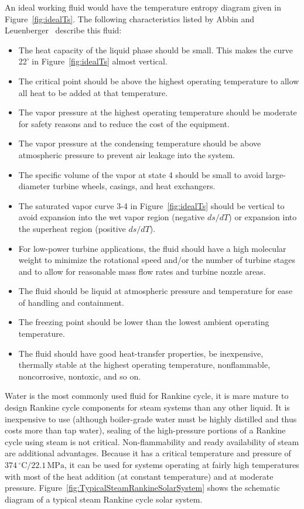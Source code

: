 An ideal working fluid would have the temperature entropy diagram given in Figure~\ref{fig:idealTs}. The following characteristics listed by Abbin and Leuenberger~\cite{Abbin1977} describe this fluid:
\begin{itemize}
  \item The heat capacity of the liquid phase should be small. This makes the curve 22' in Figure~\ref{fig:idealTs} almost vertical.
  \item The critical point should be above the highest operating temperature to allow all heat to be added at that temperature.
  \item The vapor pressure at the highest operating temperature should be moderate for safety reasons and to reduce the cost of the equipment.
  \item The vapor pressure at the condensing temperature should be above atmospheric pressure to prevent air leakage into the system.
  \item The specific volume of the vapor at state 4 should be small to avoid large-diameter turbine wheels, casings, and heat exchangers.
  \item The saturated vapor curve 3-4 in Figure~\ref{fig:idealTs} should be vertical to avoid expansion into the wet vapor region (negative $ds/dT$) or expansion into the superheat region (positive $ds/dT$).
  \item For low-power turbine applications, the fluid should have a high molecular weight to minimize the rotational speed and/or the number of turbine stages and to allow for reasonable mass flow rates and turbine nozzle areas.
  \item The fluid should be liquid at atmospheric pressure and temperature for ease of handling and containment.
  \item The freezing point should be lower than the lowest ambient operating temperature.
  \item The fluid should have good heat-transfer properties, be inexpensive, thermally stable at the highest operating temperature, nonflammable, noncorrosive, nontoxic, and so on.
\end{itemize}

Water is the most commonly used fluid for Rankine cycle, it is mare mature to design Rankine cycle components for steam systems than any other liquid. It is inexpensive to use (although boiler-grade water must be highly distilled and thus costs more than tap water), sealing of the high-pressure portions of a Rankine cycle using steam is not critical. Non-flammability and ready availability of steam are additional advantages. Because it has a critical temperature and pressure of $374\,\mathrm{^\circ C} / 22.1\,\mathrm{MPa}$, it can be used for systems operating at fairly high temperatures with most of the heat addition (at constant temperature) and at moderate pressure. Figure~\ref{fig:TypicalSteamRankineSolarSystem} shows the schematic diagram of a typical steam Rankine cycle solar system.

